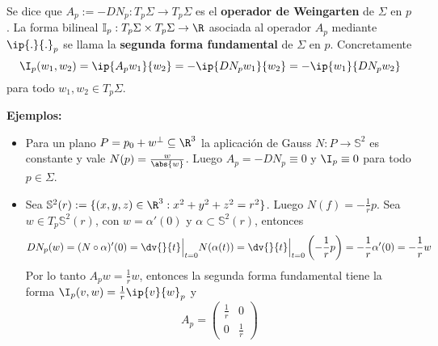 \documentclass{article}
\begin{document}
\begin{dfn}
    Se dice que $A_{p}:=-DN_{p}:T_{p}\Sigma\to T_{p}\Sigma$ es el \textbf{operador de Weingarten}
    de $\Sigma$ en $p$. La forma bilineal $\mathbb{I}_{p}:T_{p}\Sigma\times T_{p}\Sigma\to\R$
    asociada al operador $A_{p}$ mediante $\ip{.}{.}_{p}$ se llama la \textbf{segunda forma 
    fundamental} de $\Sigma$ en $p$. Concretamente
    \begin{equation*}
        \I_{p}(w_{1},w_{2})=\ip{A_{p}w_{1}}{w_{2}}=-\ip{DN_{p}w_{1}}{w_{2}}=
        -\ip{w_{1}}{DN_{p}w_{2}}
    \end{equation*}
    para todo $w_{1},w_{2}\in T_{p}\Sigma$.
\end{dfn}

\noindent\textbf{Ejemplos:}
\begin{itemize}
    \item Para un plano $P=p_{0}+w^{\perp}\subseteq\R^{3}$ la aplicación de Gauss
    $N:P\to\mathbb{S}^{2}$ es constante y vale $N(p)=\frac{w}{\abs{w}}$. Luego $A_{p}=-DN_{p}\equiv0$
    y $\I_{p}\equiv0$ para todo $p\in\Sigma$.
    
    \item Sea $\mathbb{S}^{2}(r):=\{(x,y,z)\in\R^{3}:x^{2}+y^{2}+z^{2}=r^{2}\}$. Luego 
    $N(f)=-\frac{1}{r}p$. Sea $w\in T_{p}\mathbb{S}^{2}(r)$, con $w=\alpha'(0)$ y $\alpha\subset
    \mathbb{S}^{2}(r)$, entonces
    \begin{equation*}
        DN_{p}(w)=(N\circ\alpha)'(0)=\dv{}{t}\Big|_{t=0}N(\alpha(t))=\dv{}{t}\Big|_{t=0}
        \left(-\frac{1}{r}p\right)=-\frac{1}{r}\alpha'(0)=-\frac{1}{r}w
    \end{equation*}
    Por lo tanto $A_{p}w=\frac{1}{r}w$, entonces la segunda forma fundamental tiene la forma
    $\I_{p}(v,w)=\frac{1}{r}\ip{v}{w}_{p}$ y
    \begin{equation*}
        A_{p}=\begin{pmatrix}
            \frac{1}{r} & 0 \\
            0 & \frac{1}{r}
        \end{pmatrix}
    \end{equation*}


\end{itemize}
\end{document}
